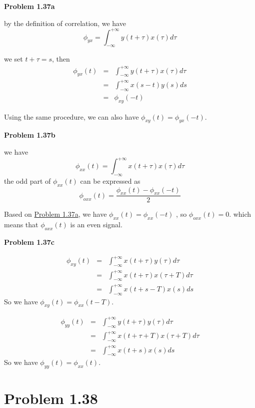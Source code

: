 \documentclass[koma,a4paper,utopia,12pt,listings-color,microtype,paralist,colorlinks,urlcolor=red]{org-article}
\begin{document}
\textbf{Problem 1.37a} \label{Problem 1.37a}

by the definition of correlation, we have
\begin{equation*}
\phi_{yx} = \int_{-\infty}^{+\infty} y(t + \tau)x(\tau) d \tau
\end{equation*}

we set \(t+ \tau = s\), then
\begin{eqnarray*}
\phi_{yx}(t) &=& \int_{-\infty}^{+\infty} y(t + \tau)x(\tau) d \tau \\
&=& \int_{-\infty}^{+\infty} x(s-t) y(s) ds \\
&=& \phi_{xy}(-t)
\end{eqnarray*}

Using the same procedure, we can also have \(\phi_{xy}(t) = \phi_{yx}(-t)\).

\textbf{Problem 1.37b}

we have
\begin{equation*}
\phi_{xx}(t) = \int_{-\infty}^{+\infty} x(t+\tau)x(\tau) d\tau
\end{equation*}
the odd part of \(\phi_{xx}(t)\) can be expressed as
\begin{equation*}
\phi_{oxx}(t) = \frac{\phi_{xx}(t) - \phi_{xx}(-t)}{2}
\end{equation*}

Based on \hyperref[Problem 1.37a]{Problem 1.37a}, we have \(\phi_{xx}(t) = \phi_{xx}(-t)\) , so
\(\phi_{oxx}(t) = 0\). which means that \(\phi_{oxx}(t)\) is an even signal.

\textbf{Problem 1.37c}

\begin{eqnarray*}
\phi_{xy}(t) &=& \int_{-\infty}^{+\infty} x(t+ \tau) y(\tau)d\tau \\
&=& \int_{-\infty}^{+\infty} x(t+ \tau) x(\tau + T)d\tau \\
&=& \int_{-\infty}^{+\infty} x(t + s -T) x(s) ds
\end{eqnarray*}
So we have \(\phi_{xy}(t) = \phi_{xx}(t-T)\).

\begin{eqnarray*}
\phi_{yy}(t) &=& \int_{-\infty}^{+\infty} y(t+ \tau) y(\tau)d\tau \\
&=& \int_{-\infty}^{+\infty} x(t+ \tau + T) x(\tau + T)d\tau \\
&=& \int_{-\infty}^{+\infty} x(t + s) x(s) ds
\end{eqnarray*}
So we have \(\phi_{yy}(t) = \phi_{xx}(t)\).
\section{Problem 1.38}
\label{sec:orgef628d7}
\end{document}
